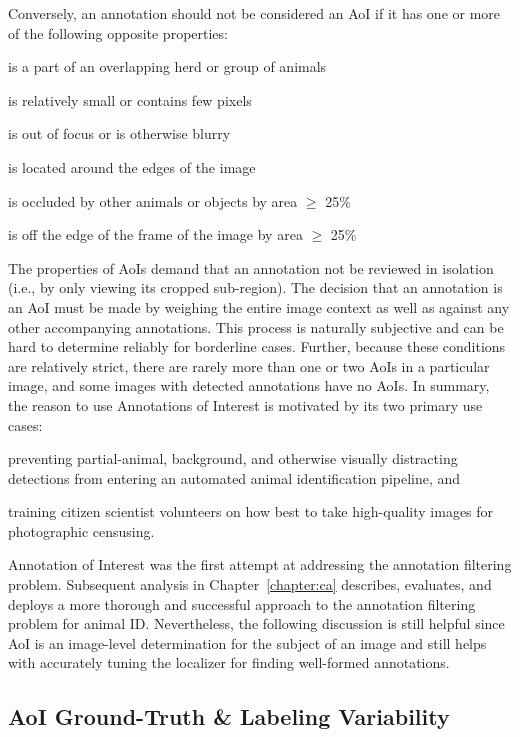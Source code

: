 \noindent Conversely, an annotation should not be considered an AoI if it has one or more of the following opposite properties:

\squishlist
\item is a part of an overlapping herd or group of animals
\item is relatively small or contains few pixels
\item is out of focus or is otherwise blurry
\item is located around the edges of the image
\item is occluded by other animals or objects by area $\geq$ 25\%
\item is off the edge of the frame of the image by area $\geq$ 25\%
\squishend

\noindent The properties of AoIs demand that an annotation not be reviewed in isolation (i.e., by only viewing its cropped sub-region).  The decision that an annotation is an AoI must be made by weighing the entire image context as well as against any other accompanying annotations.  This process is naturally subjective and can be hard to determine reliably for borderline cases.  Further, because these conditions are relatively strict, there are rarely more than one or two AoIs in a particular image, and some images with detected annotations have no AoIs.  In summary, the reason to use Annotations of Interest is motivated by its two primary use cases:

\numsquishlist
\item preventing partial-animal, background, and otherwise visually distracting detections from entering an automated animal identification pipeline, and
\item training citizen scientist volunteers on how best to take high-quality images for photographic censusing.
\numsquishend

\noindent Annotation of Interest was the first attempt at addressing the annotation filtering problem.  Subsequent analysis in Chapter~\ref{chapter:ca} describes, evaluates, and deploys a more thorough and successful approach to the annotation filtering problem for animal ID. Nevertheless, the following discussion is still helpful since AoI is an image-level determination for the subject of an image and still helps with accurately tuning the localizer for finding well-formed annotations.

\subsection{AoI Ground-Truth \& Labeling Variability}

